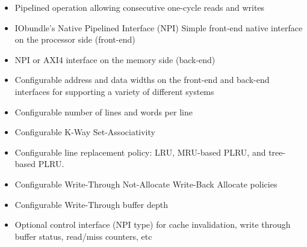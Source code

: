 \begin{itemize}
  \itemsep-0.5em
\item Pipelined operation allowing consecutive one-cycle reads and writes
\item IObundle's Native Pipelined Interface (NPI) Simple front-end native interface on the processor side (front-end)
\item NPI or AXI4 interface on the memory side (back-end)
\item Configurable address and data widths on the front-end and back-end interfaces for supporting a variety of different systems
\item Configurable number of lines and words per line
\item Configurable K-Way Set-Associativity
\item Configurable line replacement policy: LRU, MRU-based PLRU, and tree-based PLRU.
\item Configurable Write-Through Not-Allocate Write-Back Allocate policies
\item Configurable Write-Through buffer depth
\item Optional control interface (NPI type) for cache invalidation, write through buffer status, read/miss counters, etc
\end{itemize}
